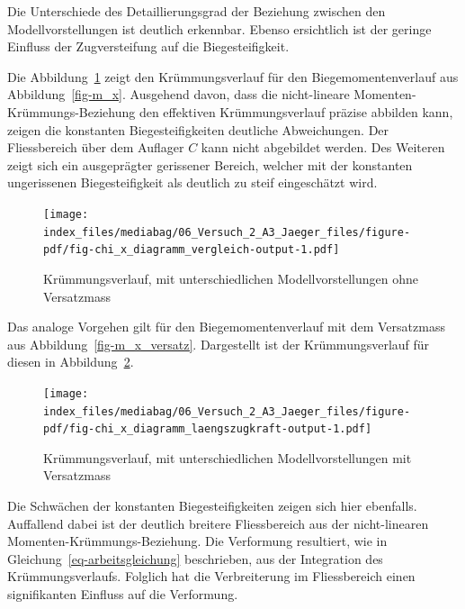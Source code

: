 \documentclass[
  12pt,
  letterpaper,
  egregdoesnotlikesansseriftitles]{scrreprt}
\begin{document}
Die Unterschiede des Detaillierungsgrad der Beziehung zwischen den
Modellvorstellungen ist deutlich erkennbar. Ebenso ersichtlich ist der
geringe Einfluss der Zugversteifung auf die Biegesteifigkeit.

Die Abbildung~\ref{fig-chi_x_diagramm_vergleich} zeigt den
Krümmungsverlauf für den Biegemomentenverlauf aus
Abbildung~\ref{fig-m_x}. Ausgehend davon, dass die nicht-lineare
Momenten-Krümmungs-Beziehung den effektiven Krümmungsverlauf präzise
abbilden kann, zeigen die konstanten Biegesteifigkeiten deutliche
Abweichungen. Der Fliessbereich über dem Auflager \(C\) kann nicht
abgebildet werden. Des Weiteren zeigt sich ein ausgeprägter gerissener
Bereich, welcher mit der konstanten ungerissenen Biegesteifigkeit als
deutlich zu steif eingeschätzt wird.

\begin{figure}[H]

{\centering \texttt{[image: index\_files/mediabag/06\_Versuch\_2\_A3\_Jaeger\_files/figure-pdf/fig-chi\_x\_diagramm\_vergleich-output-1.pdf]}

}

\caption{\label{fig-chi_x_diagramm_vergleich}Krümmungsverlauf, mit
unterschiedlichen Modellvorstellungen ohne Versatzmass}

\end{figure}

Das analoge Vorgehen gilt für den Biegemomentenverlauf mit dem
Versatzmass aus Abbildung~\ref{fig-m_x_versatz}. Dargestellt ist der
Krümmungsverlauf für diesen in
Abbildung~\ref{fig-chi_x_diagramm_laengszugkraft}.

\begin{figure}[H]

{\centering \texttt{[image: index\_files/mediabag/06\_Versuch\_2\_A3\_Jaeger\_files/figure-pdf/fig-chi\_x\_diagramm\_laengszugkraft-output-1.pdf]}

}

\caption{\label{fig-chi_x_diagramm_laengszugkraft}Krümmungsverlauf, mit
unterschiedlichen Modellvorstellungen mit Versatzmass}

\end{figure}

Die Schwächen der konstanten Biegesteifigkeiten zeigen sich hier
ebenfalls. Auffallend dabei ist der deutlich breitere Fliessbereich aus
der nicht-linearen Momenten-Krümmungs-Beziehung. Die Verformung
resultiert, wie in Gleichung~\ref{eq-arbeitsgleichung} beschrieben, aus
der Integration des Krümmungsverlaufs. Folglich hat die Verbreiterung im
Fliessbereich einen signifikanten Einfluss auf die Verformung.
\end{document}
